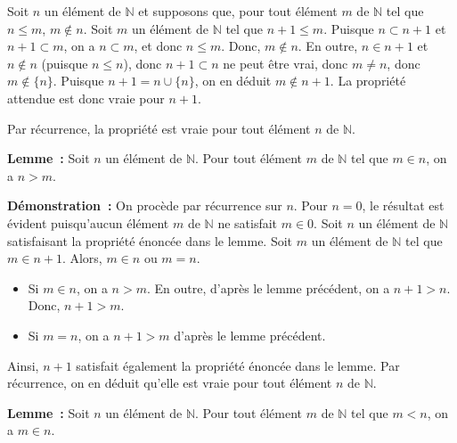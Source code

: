     Soit $n$ un élément de $\mathbb{N}$ et supposons que, pour tout élément $m$ de $\mathbb{N}$ tel que $n \leq m$, $m \notin n$. 
    Soit $m$ un élément de $\mathbb{N}$ tel que $n+1 \leq m$. 
    Puisque $n \subset n+1$ et $n+1 \subset m$, on a $n \subset m$, et donc $n \leq m$.
    Donc, $m \notin n$. 
    En outre, $n \in n+1$ et $n \notin n$ (puisque $n \leq n$), donc $n+1 \subset n$ ne peut être vrai, donc $m \neq n$, donc $m \notin \lbrace n \rbrace$. 
    Puisque $n+1 = n \cup \lbrace n \rbrace$, on en déduit $m \notin n+1$. 
    La propriété attendue est donc vraie pour $n+1$.

    Par récurrence, la propriété est vraie pour tout élément $n$ de $\mathbb{N}$.

   \done 

\medskip

\noindent\textbf{Lemme :} 
    Soit $n$ un élément de $\mathbb{N}$. 
    Pour tout élément $m$ de $\mathbb{N}$ tel que $m \in n$, on a $n > m$.

\medskip

\noindent\textbf{Démonstration :} 
    On procède par récurrence sur $n$. 
    Pour $n = 0$, le résultat est évident puisqu'aucun élément $m$ de $\mathbb{N}$ ne satisfait $m \in 0$.
    Soit $n$ un élément de $\mathbb{N}$ satisfaisant la propriété énoncée dans le lemme. 
    Soit $m$ un élément de $\mathbb{N}$ tel que $m \in n+1$. 
    Alors, $m \in n$ ou $m = n$.
    \begin{itemize}[nosep]
        \item Si $m \in n$, on a $n > m$.
            En outre, d'après le lemme précédent, on a $n+1 > n$. 
            Donc, $n+1 > m$.
        \item Si $m = n$, on a $n+1 > m$ d'après le lemme précédent.
    \end{itemize}
    Ainsi, $n+1$ satisfait également la propriété énoncée dans le lemme. 
    Par récurrence, on en déduit qu'elle est vraie pour tout élément $n$ de $\mathbb{N}$.
    
   \done 

\medskip

\noindent\textbf{Lemme :} 
    Soit $n$ un élément de $\mathbb{N}$. 
    Pour tout élément $m$ de $\mathbb{N}$ tel que $m < n$, on a $m \in n$.

\medskip

